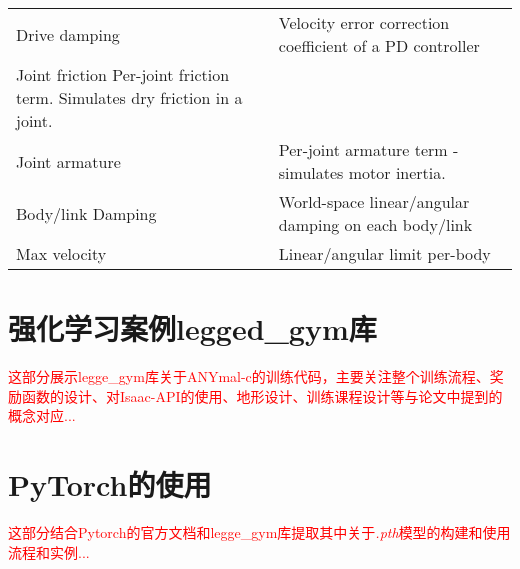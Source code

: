 \begin{table}
\begin{threeparttable}[c]
\begin{tabular}{C{4cm} C{10cm}}
      Drive damping & Velocity error correction coefficient of a PD controller\\
      Joint friction Per-joint friction term. Simulates dry friction in a joint.\\
      Joint armature & Per-joint armature term - simulates motor inertia.\\
      Body/link Damping & World-space linear/angular damping on each body/link\\
      Max velocity & Linear/angular limit per-body\\
      \bottomrule
    \end{tabular}
  \end{threeparttable}
\end{table}











\section[强化学习案例legged\_gym库]{强化学习案例legged\_gym库\cite[p1]{Rudin_Hoeller_Reist_Hutter_2021}}

\textcolor{red}{\small
这部分展示legge\_gym库关于ANYmal-c的训练代码，主要关注整个训练流程、奖励函数的设计、对Isaac-API的使用、地形设计、训练课程设计等与论文中提到的概念对应...}












\section[PyTorch的使用]{PyTorch的使用}
\textcolor{red}{\small
这部分结合Pytorch的官方文档和legge\_gym库提取其中关于\emph{.pth}模型的构建和使用流程和实例...
}